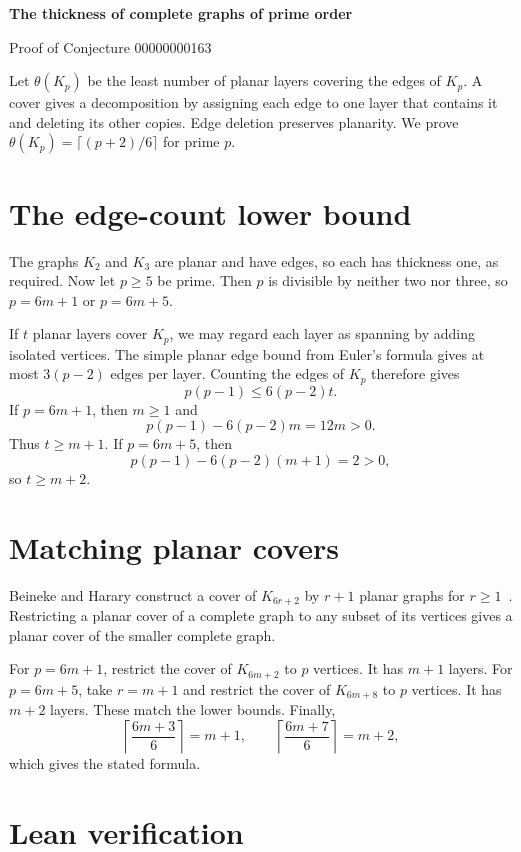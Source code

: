 \documentclass[10pt]{article}
\begin{document}
\begin{center}
  {\Large\bfseries The thickness of complete graphs of prime order\par}
  \smallskip
  Proof of Conjecture 00000000163
\end{center}

Let $\theta(K_p)$ be the least number of planar layers covering the
edges of $K_p$. A cover gives a decomposition by assigning each edge to
one layer that contains it and deleting its other copies. Edge deletion
preserves planarity. We prove $\theta(K_p)=\lceil(p+2)/6\rceil$ for prime
$p$.

\section*{The edge-count lower bound}

The graphs $K_2$ and $K_3$ are planar and have edges, so each has
thickness one, as required. Now let $p\ge5$ be prime. Then $p$ is
divisible by neither two nor three, so $p=6m+1$ or $p=6m+5$.

If $t$ planar layers cover $K_p$, we may regard each layer as spanning
by adding isolated vertices. The simple planar edge bound from Euler's
formula gives at most $3(p-2)$ edges per layer. Counting the edges of
$K_p$ therefore gives
\[
 p(p-1)\le 6(p-2)t.
\]
If $p=6m+1$, then $m\ge1$ and
\[
 p(p-1)-6(p-2)m=12m>0.
\]
Thus $t\ge m+1$. If $p=6m+5$, then
\[
 p(p-1)-6(p-2)(m+1)=2>0,
\]
so $t\ge m+2$.

\section*{Matching planar covers}

Beineke and Harary construct a cover of $K_{6r+2}$ by $r+1$ planar
graphs for $r\ge1$~\cite[p.~855 and Figure~3]{bh}. Restricting a
planar cover of a complete graph to any subset of its vertices gives a
planar cover of the smaller complete graph.

For $p=6m+1$, restrict the cover of $K_{6m+2}$ to $p$ vertices. It has
$m+1$ layers. For $p=6m+5$, take $r=m+1$ and restrict the cover of
$K_{6m+8}$ to $p$ vertices. It has $m+2$ layers. These match the lower
bounds. Finally,
\[
 \left\lceil\frac{6m+3}{6}\right\rceil=m+1,\qquad
 \left\lceil\frac{6m+7}{6}\right\rceil=m+2,
\]
which gives the stated formula.

\section*{Lean verification}
\end{document}
